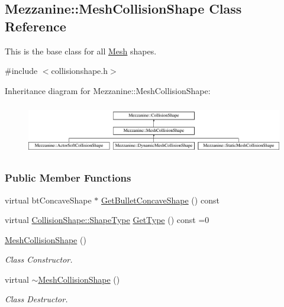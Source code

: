 \hypertarget{classMezzanine_1_1MeshCollisionShape}{
\subsection{Mezzanine::MeshCollisionShape Class Reference}
\label{classMezzanine_1_1MeshCollisionShape}
}


This is the base class for all \hyperlink{classMezzanine_1_1Mesh}{Mesh} shapes.  




{\ttfamily \#include $<$collisionshape.h$>$}

Inheritance diagram for Mezzanine::MeshCollisionShape:\begin{figure}[H]
\begin{center}
\leavevmode
\includegraphics[height=2.231076cm]{classMezzanine_1_1MeshCollisionShape}
\end{center}
\end{figure}
\subsubsection*{Public Member Functions}
\begin{DoxyCompactItemize}
\item 
virtual btConcaveShape $\ast$ \hyperlink{classMezzanine_1_1MeshCollisionShape_a0a39875a6ca86c1a02c5432e04b80820}{GetBulletConcaveShape} () const 
\item 
virtual \hyperlink{classMezzanine_1_1CollisionShape_ad04186055565998879b64176d6dd100d}{CollisionShape::ShapeType} \hyperlink{classMezzanine_1_1MeshCollisionShape_a00dc444afac92030ea43815ec21dd8e8}{GetType} () const =0
\item 
\hypertarget{classMezzanine_1_1MeshCollisionShape_a5d5424990596460bfa86774b31eceba1}{
\hyperlink{classMezzanine_1_1MeshCollisionShape_a5d5424990596460bfa86774b31eceba1}{MeshCollisionShape} ()}
\label{classMezzanine_1_1MeshCollisionShape_a5d5424990596460bfa86774b31eceba1}

\begin{DoxyCompactList}\small\item\em Class Constructor. \item\end{DoxyCompactList}\item 
\hypertarget{classMezzanine_1_1MeshCollisionShape_a7e0554bdd88471091de94a488d18264e}{
virtual \hyperlink{classMezzanine_1_1MeshCollisionShape_a7e0554bdd88471091de94a488d18264e}{$\sim$MeshCollisionShape} ()}
\label{classMezzanine_1_1MeshCollisionShape_a7e0554bdd88471091de94a488d18264e}

\begin{DoxyCompactList}\small\item\em Class Destructor. \item\end{DoxyCompactList}\end{DoxyCompactItemize}
